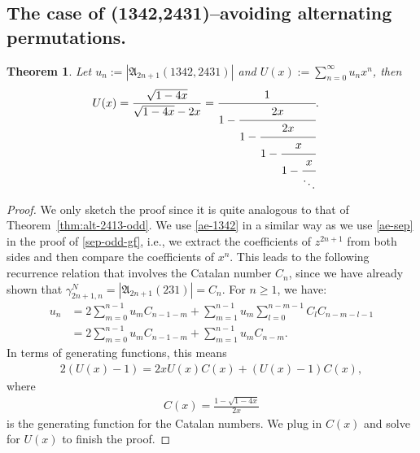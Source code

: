 \documentclass[12pt,reqno]{amsart}
\numberwithin{equation}{section}
\theoremstyle{plain}
\newtheorem{theorem}{Theorem}[section]
\theoremstyle{definition}
\def\A{\mathfrak{A}}
\begin{document}
\subsection{The case of (1342,2431)--avoiding alternating permutations.}
\begin{theorem}\label{case1342-2431}
Let $u_{n}:=|\A_{2n+1}(1342,2431)|$ and  $U(x):=\sum\limits_{n=0}^{\infty}u_{n}x^n$, then
\begin{align}\label{1342-odd-gf}
U(x)&=\frac{\sqrt{1-4x}}{\sqrt{1-4x}-2x}=\cfrac{1}{1-\cfrac{2x}{1-\cfrac{2x}{1-\cfrac{x}{1-\cfrac{x}{\ddots}}}}}.
\end{align}
\end{theorem}
\begin{proof}
We only sketch the proof since it is quite analogous to that of Theorem~\ref{thm:alt-2413-odd}. We use \eqref{ae-1342} in a similar way as we use \eqref{ae-sep} in the proof of \eqref{sep-odd-gf}, i.e., we extract the coefficients of $z^{2n+1}$ from both sides and then compare the coefficients of $x^{n}$. This leads to the following recurrence relation that involves the Catalan number $C_n$, since we have already shown that $\gamma_{2n+1,n}^N=|\A_{2n+1}(231)|=C_n$. For $n\ge 1$, we have:
\begin{align*}
u_n&=2\sum_{m=0}^{n-1}u_mC_{n-1-m}+\sum_{m=1}^{n-1}u_m\sum_{l=0}^{n-m-1}C_lC_{n-m-l-1}\\
&=2\sum_{m=0}^{n-1}u_mC_{n-1-m}+\sum_{m=1}^{n-1}u_mC_{n-m}.
\end{align*}
In terms of generating functions, this means
\begin{align*}
2(U(x)-1)=2xU(x)C(x)+(U(x)-1)C(x),
\end{align*}
where
\begin{align*}
C(x)=\frac{1-\sqrt{1-4x}}{2x}
\end{align*}
is the generating function for the Catalan numbers. We plug in $C(x)$ and solve for $U(x)$ to finish the proof.
\end{proof}
\end{document}
